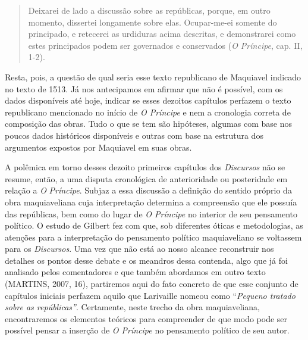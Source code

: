 \begin{quote}
Deixarei de lado a discussão sobre as repúblicas, porque, em outro
momento, dissertei longamente sobre elas. Ocupar-me-ei somente do
principado, e retecerei as urdiduras acima descritas, e demonstrarei
como estes principados podem ser governados e conservados (\emph{O
Príncipe}, cap. II, 1-2).
\end{quote}

Resta, pois, a questão de qual seria esse texto republicano de Maquiavel
indicado no texto de 1513. Já nos antecipamos em afirmar que não é
possível, com os dados disponíveis até hoje, indicar se esses dezoitos
capítulos perfazem o texto republicano mencionado no início de \emph{O
Príncipe} e nem a cronologia correta de composição das obras. Tudo o que
se tem são hipóteses, algumas com base nos poucos dados históricos
disponíveis e outras com base na estrutura dos argumentos expostos por
Maquiavel em suas obras.

A polêmica em torno desses dezoito primeiros capítulos dos
\emph{Discursos} não se resume, então, a uma disputa cronológica de
anterioridade ou posteridade em relação a \emph{O} \emph{Príncipe}.
Subjaz a essa discussão a definição do sentido próprio da obra
maquiaveliana cuja interpretação determina a compreensão que ele possuía
das repúblicas, bem como do lugar de \emph{O Príncipe} no interior de
seu pensamento político. O estudo de Gilbert fez com que, sob diferentes
óticas e metodologias, as atenções para a interpretação do pensamento
político maquiaveliano se voltassem para os \emph{Discursos}. Uma vez
que não está ao nosso alcance reconstruir nos detalhes os pontos desse
debate e os meandros dessa contenda, algo que já foi analisado pelos
comentadores e que também abordamos em outro texto (MARTINS, 2007, 16),
partiremos aqui do fato concreto de que esse conjunto de capítulos
iniciais perfazem aquilo que Larivaille nomeou como ``\emph{Pequeno
tratado sobre as repúblicas''}. Certamente, neste trecho da obra
maquiaveliana, encontraremos os elementos teóricos para compreender de
que modo pode ser possível pensar a inserção de \emph{O Príncipe} no
pensamento político de seu autor.


